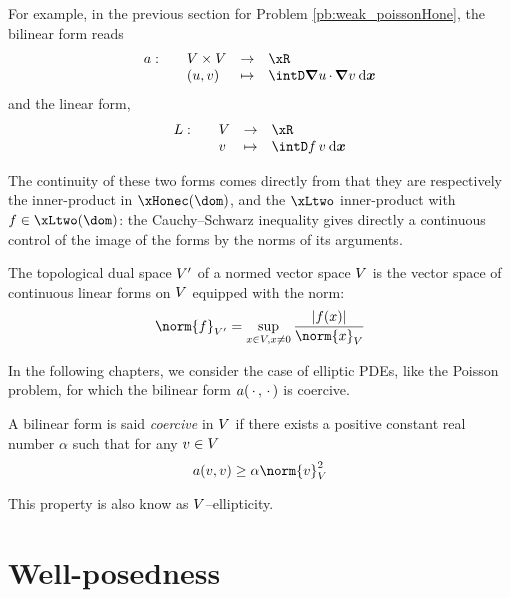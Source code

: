 \medskip
For example, in the previous section for Problem \eqref{pb:weak_poissonHone}, the bilinear form reads
\begin{equation*}
\begin{array}{llll}
a:\quad& \xV\times \xV &\rightarrow& \xR \\
\hfill & (u,v)     &\mapsto    & \displaystyle\intD \Grad u \xDot \Grad v \dxx
\end{array}
\end{equation*}
and the linear form,
\begin{equation*}
\begin{array}{llll}
L:\quad& \xV &\rightarrow& \xR \\
\hfill &   v &\mapsto    & \displaystyle\intD f\,v \dxx
\end{array}
\end{equation*}

The continuity of these two forms comes directly from that they are respectively the inner-product in $\xHonec(\dom)$, and the $\xLtwo$ inner-product with $f \in \xLtwo(\dom)$: the Cauchy--Schwarz inequality gives directly a continuous control of the image of the forms by the norms of its arguments.

\medskip
\begin{dfntn}
The topological dual space ${V}'$ of a normed vector space ${V}$ is the vector space of continuous linear forms on ${V}$ equipped with the norm:
\begin{equation*}
\norm{f}_{\xV'} = \sup_{x \in \xV, x \neq 0} \dfrac{|f(x)|}{\norm{x}_\xV}
\end{equation*}
\end{dfntn}

\medskip

In the following chapters, we consider the case of elliptic PDEs, like the Poisson problem, for which the bilinear form $a(\,{\mathbf\cdot}\,,\,{\mathbf\cdot}\,)$ is coercive.
\begin{prpstn}[Coercivity]
A bilinear form is said \textit{coercive} in ${V}$ if there exists a positive constant real number $\alpha$ such that for any $v \in {V}$
\begin{equation*}
a( v, v ) \geq \alpha \norm{v}^2_\xV
\end{equation*}
\end{prpstn}
This property is also know as ${V}$--ellipticity.

\section{Well-posedness}

